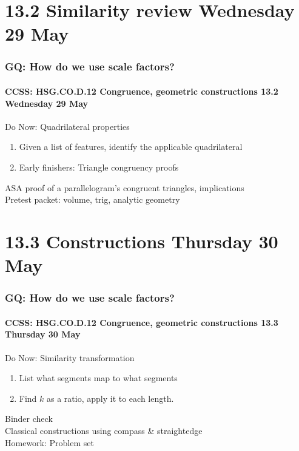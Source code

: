 \documentclass{beamer}
\begin{document}
\section{13.2 Similarity review Wednesday 29 May}
  \frame
  {
    \frametitle{GQ: How do we use scale factors?}
    \framesubtitle{CCSS: HSG.CO.D.12 Congruence, geometric constructions \hfill \alert{13.2 Wednesday 29 May}}

    \begin{block}{Do Now: Quadrilateral properties}
      \begin{enumerate}
        \item Given a list of features, identify the applicable quadrilateral
        \item Early finishers: Triangle congruency proofs
      \end{enumerate}
    \end{block}
    ASA proof of a parallelogram's congruent triangles, implications\\
    Pretest packet: volume, trig, analytic geometry
  }

\section{13.3 Constructions Thursday 30 May}
  \frame
  {
    \frametitle{GQ: How do we use scale factors?}
    \framesubtitle{CCSS: HSG.CO.D.12 Congruence, geometric constructions \hfill \alert{13.3 Thursday 30 May}}

    \begin{block}{Do Now: Similarity transformation}
      \begin{enumerate}
        \item List what segments map to what segments
        \item Find $k$ as a ratio, apply it to each length.
      \end{enumerate}
    \end{block}
    Binder check\\
    Classical constructions using compass \& straightedge\\[0.5cm]
    Homework: Problem set
  }
\end{document}
